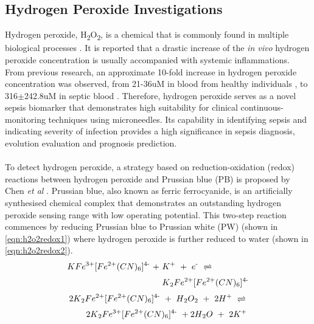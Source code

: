 \subsection{Hydrogen Peroxide Investigations}
Hydrogen peroxide, H\textsubscript{2}O\textsubscript{2}, is a chemical that is commonly found in multiple biological processes \cite{Pravda2014}. It is reported that a drastic increase of the \textit{in vivo} hydrogen peroxide concentration is usually accompanied with systemic inflammations. From previous research, an approximate 10-fold increase in hydrogen peroxide concentration was observed, from 21-36uM in blood from healthy individuals \cite{FORMAN201648}, to 316$\pm$242.8uM in septic blood \cite{VanAsbeck1995}. Therefore, hydrogen peroxide serves as a novel sepsis biomarker that demonstrates high suitability for clinical continuous-monitoring techniques using microneedles.  Its capability in identifying sepsis and indicating severity of infection provides a high significance in sepsis diagnosis, evolution evaluation and prognosis prediction.\\\\
\noindent To detect hydrogen peroxide, a strategy based on reduction-oxidation (redox) reactions between hydrogen peroxide and Prussian blue (PB) is proposed by Chen \textit{et al} \cite{C9AN02438G}. Prussian blue, also known as ferric ferrocyanide, is an artificially synthesised chemical complex that demonstrates an outstanding hydrogen peroxide sensing range with low operating potential. This two-step reaction commences by reducing Prussian blue to Prussian white (PW) (shown in \autoref{eqn:h2o2redox1}) where hydrogen peroxide is further reduced to water (shown in \autoref{eqn:h2o2redox2}).
\begin{align} \label{eqn:h2o2redox1}
    KFe^{3+}[Fe\textsuperscript{2+}(CN)\textsubscript{6}]\textsuperscript{4-} \ + \ & K\textsuperscript{+} \ + \   e\textsuperscript{-} \ \xrightleftharpoons{} \\ \nonumber & K\textsubscript{2}Fe\textsuperscript{2+}[Fe\textsuperscript{2+}(CN)\textsubscript{6}]\textsuperscript{4-}
\end{align}
\begin{align} \label{eqn:h2o2redox2}
    & 2K\textsubscript{2}Fe\textsuperscript{2+}[Fe\textsuperscript{2+}(CN)\textsubscript{6}]\textsuperscript{4-} \ + \  H\textsubscript{2}O\textsubscript{2} \ + \ 2H\textsuperscript{+} \ \xrightleftharpoons{} \\ \nonumber & \quad \quad 2K\textsubscript{2}Fe\textsuperscript{3+}[Fe\textsuperscript{2+}(CN)\textsubscript{6}]\textsuperscript{4-} \ + 2H\textsubscript{2}O \ + \ 2K\textsuperscript{+}
\end{align}
